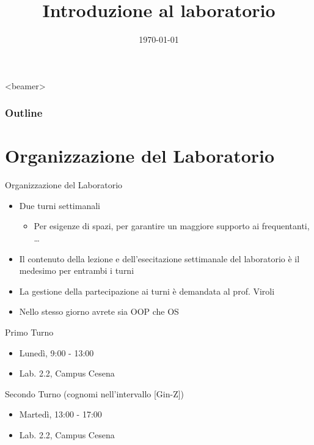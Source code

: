 \documentclass[xcolor=dvipsnames,presentation]{beamer}
\title[{\lab} -- Introduzione]{Introduzione al laboratorio}
\date[\today]{\today}
\begin{document}
\frame[label=coverpage]{\titlepage}

\begin{frame}<beamer>
	\frametitle{Outline}
	\tableofcontents[]
\end{frame}

\section{Organizzazione del Laboratorio}\label{sec:organizzazione-del-laboratorio}

\begin{frame}{Organizzazione del Laboratorio}
    \begin{itemize}
        \item Due turni settimanali
        \begin{itemize}
            \item Per esigenze di spazi, per garantire un maggiore supporto ai frequentanti, \dots
        \end{itemize}
        \item Il contenuto della lezione e dell'esecitazione settimanale del laboratorio è il medesimo per entrambi i turni
        \item La gestione della partecipazione ai turni è demandata al prof. Viroli
        \item Nello stesso giorno avrete sia OOP che OS
    \end{itemize}
    \begin{block}{Primo Turno}
        \begin{itemize}
            \item Lunedì, 9:00 - 13:00
            \item Lab. 2.2, Campus Cesena
        \end{itemize}
    \end{block}
    \begin{block}{Secondo Turno (cognomi nell'intervallo [Gin-Z])}
        \begin{itemize}
            \item Martedì, 13:00 - 17:00
            \item Lab. 2.2, Campus Cesena
        \end{itemize}
    \end{block}
\end{frame}

\end{document}

